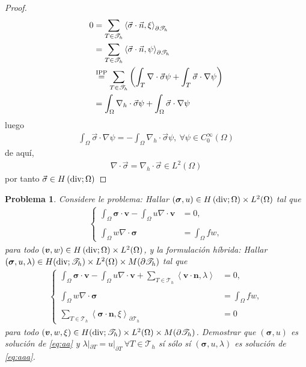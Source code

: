 \documentclass[10pt,a4paper]{report}
\newtheorem{pro}{Problema}
\newcommand{\bs}{\boldsymbol}
\newcommand{\Th}{\mathscr{T}_{h}}
\newcommand{\Hdiv}{H\left(\textup{div};\Omega\right)}
\newcommand{\Hdivt}{H(\textup{div};\mathscr{T}_{h})}
\providecommand{\PI}[2]{\left\langle #1,#2  \right\rangle}
\begin{document}
\begin{proof}
         \begin{align*}
         	0 &=	\sum_{T\in\mathscr{T}_{h}}\PI{\vec{\sigma}\cdot\vec{n}}{\xi}_{\partial\Th}\\
         	&= 	\sum_{T\in\mathscr{T}_{h}}\PI{\vec{\sigma}\cdot\vec{n}}{\psi}_{\partial\Th}\\
         	&\overset{\textup{IPP}}{=} \sum_{T\in\mathscr{T}_{h}} \left(\int_{T}\nabla\cdot\vec{\sigma}\psi + \int_{T}\vec{\sigma}\cdot\nabla\psi\right) \\
         	&= \int_{\Omega}\nabla_{h}\cdot\vec{\sigma}\psi + \int_{\Omega}\vec{\sigma}\cdot\nabla\psi
         \end{align*}
         luego 
         \begin{align*}
         	\int_{\Omega}\vec{\sigma}\cdot\nabla\psi = -\int_{\Omega}\nabla_{h}\cdot\vec{\sigma}\psi,\ \forall\psi\in C^{\infty}_{0}(\Omega)
         \end{align*}
         de aquí,
         \begin{align*}
         \nabla\cdot\vec{\sigma} = \nabla_{h}\cdot\vec{\sigma} \in L^{2}(\Omega)
         \end{align*}
        por tanto $\vec{\sigma}\in\Hdiv$
    \end{proof}
    \begin{pro}
    		Considere le problema: Hallar $(\bs{\sigma},u)\in\Hdiv \times L^{2}(\Omega)$ tal que 
    		\begin{align}\label{eq:aa}
    			\begin{cases}
    				\displaystyle\int_{\Omega}\bs{\sigma}\cdot\bs{v} - \int_{\Omega}u\nabla\cdot\bs{v}  &= 0, \\~\\ 
    			\displaystyle\int_{\Omega}w\nabla\cdot\bs{\sigma} &= 	\displaystyle\int_{\Omega}fw,	 
    			\end{cases}
    		\end{align}
    	para todo $(\bs{v},w)\in\Hdiv\times L^{2}(\Omega)$, y la formulación híbrida: Hallar $(\bs{\sigma},u,\lambda)\in\Hdivt\times L^{2}(\Omega)\times M(\partial\Th)$ tal que
    	\begin{align}\label{eq:aaa}
    		\begin{cases}
    			\displaystyle\int_{\Omega}\bs{\sigma}\cdot\bs{v} - \int_{\Omega}u\nabla\cdot\bs{v} + \sum_{T\in\mathscr{T}_{h}}\PI{\bs{v}\cdot\bs{n}}{\lambda}  &= 0, \\~\\ 
    			\displaystyle\int_{\Omega}w\nabla\cdot\bs{\sigma} &= 	\displaystyle\int_{\Omega}fw,\\~\\
    			\displaystyle\sum_{T\in\mathscr{T}_{h}}\PI{\bs{\sigma}\cdot\bs{n}}{\xi}_{\partial\Th} &= 0	 
    		\end{cases}
    	\end{align}
        para todo $(\bs{v},w,\xi)\in\Hdivt\times L^{2}(\Omega)\times M(\partial\Th)$. Demostrar que $(\bs{\sigma},u)$ es solución de \eqref{eq:aa} y $\lambda|_{\partial T} = u|_{\partial T}\ \forall T\in \Th$ sí sólo sí $(\bs{\sigma},u,\lambda)$ es solución de \eqref{eq:aaa}.
    \end{pro}
\end{document}
